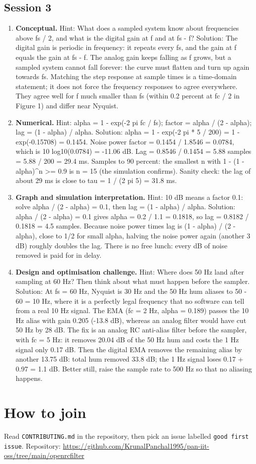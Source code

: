\documentclass[11pt,a4paper]{article}
\begin{document}
\subsection*{Session 3}
\begin{enumerate}[nosep]
\item \textbf{Conceptual.} Hint: What does a sampled system know about frequencies above fs / 2, and what is the digital gain at f and at fs - f? Solution: The digital gain is periodic in frequency: it repeats every fs, and the gain at f equals the gain at fs - f. The analog gain keeps falling as f grows, but a sampled system cannot fall forever: the curve must flatten and turn up again towards fs. Matching the step response at sample times is a time-domain statement; it does not force the frequency responses to agree everywhere. They agree well for f much smaller than fs (within 0.2 percent at fc / 2 in Figure 1) and differ near Nyquist.
\item \textbf{Numerical.} Hint: alpha = 1 - exp(-2 pi fc / fs); factor = alpha / (2 - alpha); lag = (1 - alpha) / alpha. Solution: alpha = 1 - exp(-2 pi * 5 / 200) = 1 - exp(-0.15708) = 0.1454. Noise power factor = 0.1454 / 1.8546 = 0.0784, which is 10 log10(0.0784) = -11.06 dB. Lag = 0.8546 / 0.1454 = 5.88 samples = 5.88 / 200 = 29.4 ms. Samples to 90 percent: the smallest n with 1 - (1 - alpha)\textasciicircum{}n \textgreater{}= 0.9 is n = 15 (the simulation confirms). Sanity check: the lag of about 29 ms is close to tau = 1 / (2 pi 5) = 31.8 ms.
\item \textbf{Graph and simulation interpretation.} Hint: 10 dB means a factor 0.1: solve alpha / (2 - alpha) = 0.1, then lag = (1 - alpha) / alpha. Solution: alpha / (2 - alpha) = 0.1 gives alpha = 0.2 / 1.1 = 0.1818, so lag = 0.8182 / 0.1818 = 4.5 samples. Because noise power times lag is (1 - alpha) / (2 - alpha), close to 1/2 for small alpha, halving the noise power again (another 3 dB) roughly doubles the lag. There is no free lunch: every dB of noise removed is paid for in delay.
\item \textbf{Design and optimisation challenge.} Hint: Where does 50 Hz land after sampling at 60 Hz? Then think about what must happen before the sampler. Solution: At fs = 60 Hz, Nyquist is 30 Hz and the 50 Hz hum aliases to \textbar{}50 - 60\textbar{} = 10 Hz, where it is a perfectly legal frequency that no software can tell from a real 10 Hz signal. The EMA (fc = 2 Hz, alpha = 0.189) passes the 10 Hz alias with gain 0.205 (-13.8 dB), whereas an analog filter would have cut 50 Hz by 28 dB. The fix is an analog RC anti-alias filter before the sampler, with fc = 5 Hz: it removes 20.04 dB of the 50 Hz hum and costs the 1 Hz signal only 0.17 dB. Then the digital EMA removes the remaining alias by another 13.75 dB: total hum removed 33.8 dB; the 1 Hz signal loses 0.17 + 0.97 = 1.1 dB. Better still, raise the sample rate to 500 Hz so that no aliasing happens.
\end{enumerate}

\section{How to join}
Read \texttt{CONTRIBUTING.md} in the repository, then pick an issue labelled \texttt{good first issue}. Repository: \url{https://github.com/KrunalPanchal1995/pan-iit-oss/tree/main/openrcfilter}
\end{document}
